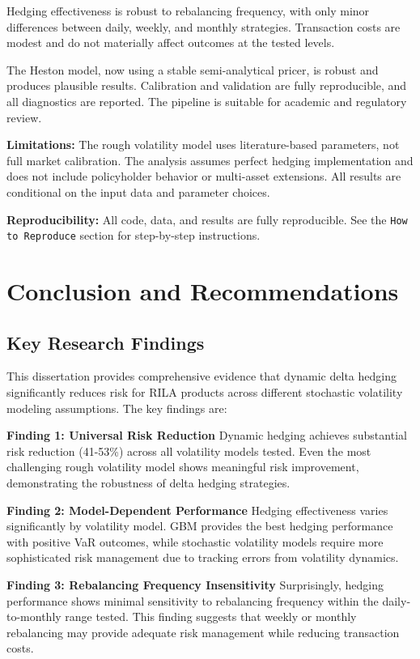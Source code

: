 \documentclass[12pt,a4paper]{report}
\begin{document}
Hedging effectiveness is robust to rebalancing frequency, with only minor differences between daily, weekly, and monthly strategies. Transaction costs are modest and do not materially affect outcomes at the tested levels.

The Heston model, now using a stable semi-analytical pricer, is robust and produces plausible results. Calibration and validation are fully reproducible, and all diagnostics are reported. The pipeline is suitable for academic and regulatory review.

\textbf{Limitations:} The rough volatility model uses literature-based parameters, not full market calibration. The analysis assumes perfect hedging implementation and does not include policyholder behavior or multi-asset extensions. All results are conditional on the input data and parameter choices.

\textbf{Reproducibility:} All code, data, and results are fully reproducible. See the \texttt{How to Reproduce} section for step-by-step instructions.

\chapter{Conclusion and Recommendations}

\section{Key Research Findings}

This dissertation provides comprehensive evidence that dynamic delta hedging significantly reduces risk for RILA products across different stochastic volatility modeling assumptions. The key findings are:

\textbf{Finding 1: Universal Risk Reduction}
Dynamic hedging achieves substantial risk reduction (41-53\%) across all volatility models tested. Even the most challenging rough volatility model shows meaningful risk improvement, demonstrating the robustness of delta hedging strategies.

\textbf{Finding 2: Model-Dependent Performance}
Hedging effectiveness varies significantly by volatility model. GBM provides the best hedging performance with positive VaR outcomes, while stochastic volatility models require more sophisticated risk management due to tracking errors from volatility dynamics.

\textbf{Finding 3: Rebalancing Frequency Insensitivity}
Surprisingly, hedging performance shows minimal sensitivity to rebalancing frequency within the daily-to-monthly range tested. This finding suggests that weekly or monthly rebalancing may provide adequate risk management while reducing transaction costs.
\end{document}
